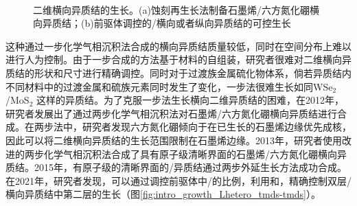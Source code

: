     \begin{figure}[htb]
        \\[-0.5ex]
        \caption{二维横向异质结的生长。(a)蚀刻再生长法制备石墨烯/六方氮化硼横向异质结；(b)前驱体调控的/横向或者纵向异质结的可控生长}
    \end{figure}

    这种通过一步化学气相沉积法合成的横向异质结质量较低，同时在空间分布上难以进行人为控制。由于一步合成的方法基于材料的自组装，研究者很难对二维横向异质结的形状和尺寸进行精确调控。同时对于过渡族金属硫化物体系，倘若异质结内不同材料中的过渡金属和硫族元素同时发生了变化，一步法很难生长如同WSe$_2$/MoS$_2$ 这样的异质结。为了克服一步法生长横向二维异质结的困难，在2012年，研究者发展出了通过两步化学气相沉积法对石墨烯/六方氮化硼横向异质结进行合成。在两步法中，研究者发现六方氮化硼倾向于在已生长的石墨烯边缘优先成核，因此可以将二维横向异质结的生长范围限制在石墨烯边缘。2013年，研究者使用改进的两步化学气相沉积法合成了具有原子级清晰界面的石墨烯/六方氮化硼横向异质结。2015年，有原子级的清晰界面的/异质结通过两步外延生长方法成功合成。在2021年，研究者发现，可以通过调控前驱体中/的比例，利用和，精确控制双层/横向异质结中第二层的生长（图\ref{fig:intro_growth_Lhetero_tmds-tmds}）。

